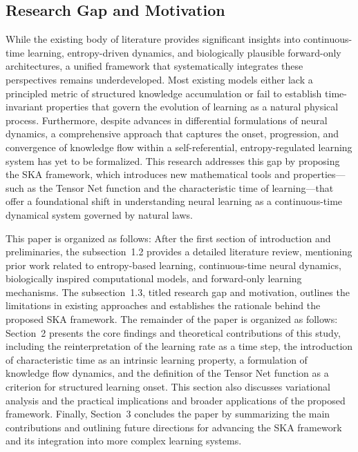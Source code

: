 \documentclass{article}
\begin{document}
\subsection{Research Gap and Motivation}
While the existing body of literature provides significant insights into continuous-time learning, entropy-driven dynamics, and biologically plausible forward-only architectures, a unified framework that systematically integrates these perspectives remains underdeveloped. Most existing models either lack a principled metric of structured knowledge accumulation or fail to establish time-invariant properties that govern the evolution of learning as a natural physical process. Furthermore, despite advances in differential formulations of neural dynamics, a comprehensive approach that captures the onset, progression, and convergence of knowledge flow within a self-referential, entropy-regulated learning system has yet to be formalized. This research addresses this gap by proposing the SKA framework, which introduces new mathematical tools and properties—such as the Tensor Net function and the characteristic time of learning—that offer a foundational shift in understanding neural learning as a continuous-time dynamical system governed by natural laws.

This paper is organized as follows: After the first section of introduction and preliminaries, the subsection~1.2 provides a detailed literature review, mentioning prior work related to entropy-based learning, continuous-time neural dynamics, biologically inspired computational models, and forward-only learning mechanisms. The subsection~1.3, titled research gap and motivation, outlines the limitations in existing approaches and establishes the rationale behind the proposed SKA framework. The remainder of the paper is organized as follows: Section~2 presents the core findings and theoretical contributions of this study, including the reinterpretation of the learning rate as a time step, the introduction of characteristic time as an intrinsic learning property, a formulation of knowledge flow dynamics, and the definition of the Tensor Net function as a criterion for structured learning onset. This section also discusses variational analysis and the practical implications and broader applications of the proposed framework. Finally, Section~3 concludes the paper by summarizing the main contributions and outlining future directions for advancing the SKA framework and its integration into more complex learning systems.
\end{document}
